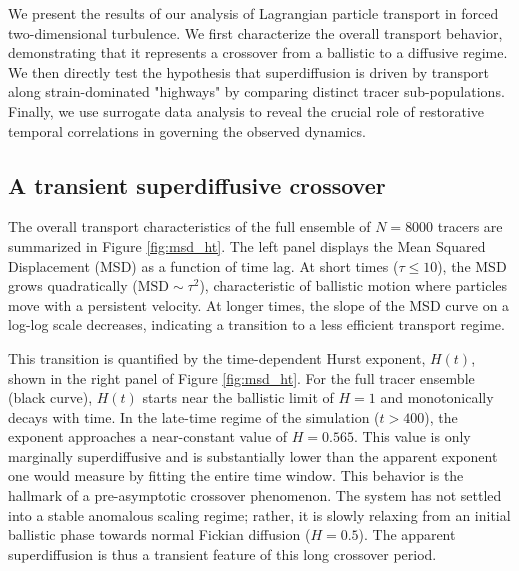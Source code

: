 \documentclass[]{article}
\begin{document}
We present the results of our analysis of Lagrangian particle transport in forced two-dimensional turbulence. We first characterize the overall transport behavior, demonstrating that it represents a crossover from a ballistic to a diffusive regime. We then directly test the hypothesis that superdiffusion is driven by transport along strain-dominated "highways" by comparing distinct tracer sub-populations. Finally, we use surrogate data analysis to reveal the crucial role of restorative temporal correlations in governing the observed dynamics.

\subsection{A transient superdiffusive crossover}

The overall transport characteristics of the full ensemble of $N=8000$ tracers are summarized in Figure \ref{fig:msd_ht}. The left panel displays the Mean Squared Displacement (MSD) as a function of time lag. At short times ($\tau \leq 10$), the MSD grows quadratically ($\mathrm{MSD} \sim \tau^2$), characteristic of ballistic motion where particles move with a persistent velocity. At longer times, the slope of the MSD curve on a log-log scale decreases, indicating a transition to a less efficient transport regime.

This transition is quantified by the time-dependent Hurst exponent, $H(t)$, shown in the right panel of Figure \ref{fig:msd_ht}. For the full tracer ensemble (black curve), $H(t)$ starts near the ballistic limit of $H=1$ and monotonically decays with time. In the late-time regime of the simulation ($t > 400$), the exponent approaches a near-constant value of $H = 0.565$. This value is only marginally superdiffusive and is substantially lower than the apparent exponent one would measure by fitting the entire time window. This behavior is the hallmark of a pre-asymptotic crossover phenomenon. The system has not settled into a stable anomalous scaling regime; rather, it is slowly relaxing from an initial ballistic phase towards normal Fickian diffusion ($H=0.5$). The apparent superdiffusion is thus a transient feature of this long crossover period.
\end{document}
